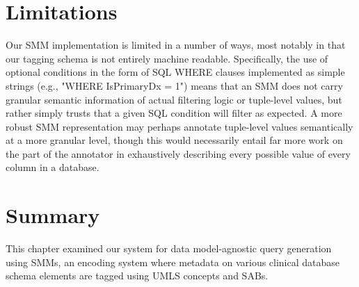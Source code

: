 \documentclass[../main.tex]{subfiles}
\begin{document}
\section{Limitations}

Our SMM implementation is limited in a number of ways, most notably in that our tagging schema is not entirely machine readable. Specifically, the use of optional conditions in the form of SQL WHERE clauses implemented as simple strings (e.g., "WHERE IsPrimaryDx = 1") means that an SMM does not carry granular semantic information of actual filtering logic or tuple-level values, but rather simply trusts that a given SQL condition will filter as expected. A more robust SMM representation may perhaps annotate tuple-level values semantically at a more granular level, though this would necessarily entail far more work on the part of the annotator in exhaustively describing every possible value of every column in a database.

\section{Summary}

This chapter examined our system for data model-agnostic query generation using SMMs, an encoding system where metadata on various clinical database schema elements are tagged using UMLS concepts and SABs. 
\end{document}
